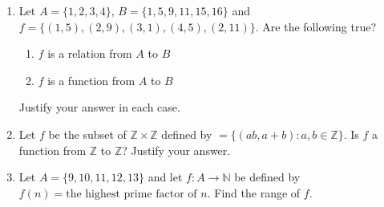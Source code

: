 \documentclass[11pt]{article}
\begin{document}
\begin{enumerate}
\item Let $A=\{1,2,3,4\}$, $B=\{1,5,9,11,15,16\}$ and
$f=\{(1,5),(2,9),(3,1),(4,5),(2,11)\}.$
Are the following true?
\begin{enumerate}
\item $f$ is a relation from $A$ to $B$
\item $f$ is a function from $A$ to $B$
\end{enumerate}
Justify your answer in each case.

\item Let $f$ be the subset of $\mathbb{Z}\times\mathbb{Z}$ defined by
$=\{(ab,a+b):a,b\in\mathbb{Z}\}.$
Is $f$ a function from $\mathbb{Z}$ to $\mathbb{Z}$? Justify your answer.

\item Let $A=\{9,10,11,12,13\}$ and let $f:A\to\mathbb{N}$ be defined by
$f(n)=\text{the highest prime factor of }n.$
Find the range of $f$.

\end{enumerate}
\end{document}
